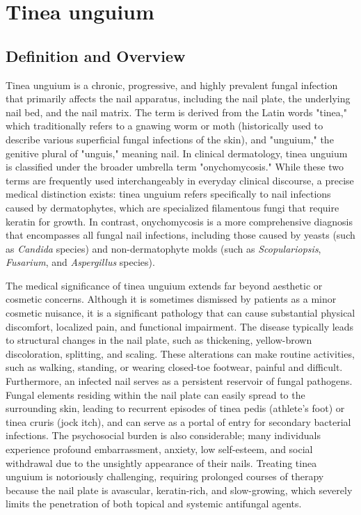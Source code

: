 \chapter{Tinea unguium}

\section*{Definition and Overview}
Tinea unguium is a chronic, progressive, and highly prevalent fungal infection that primarily affects the nail apparatus, including the nail plate, the underlying nail bed, and the nail matrix. The term is derived from the Latin words "tinea," which traditionally refers to a gnawing worm or moth (historically used to describe various superficial fungal infections of the skin), and "unguium," the genitive plural of "unguis," meaning nail. In clinical dermatology, tinea unguium is classified under the broader umbrella term "onychomycosis." While these two terms are frequently used interchangeably in everyday clinical discourse, a precise medical distinction exists: tinea unguium refers specifically to nail infections caused by dermatophytes, which are specialized filamentous fungi that require keratin for growth. In contrast, onychomycosis is a more comprehensive diagnosis that encompasses all fungal nail infections, including those caused by yeasts (such as \textit{Candida} species) and non-dermatophyte molds (such as \textit{Scopulariopsis}, \textit{Fusarium}, and \textit{Aspergillus} species).

The medical significance of tinea unguium extends far beyond aesthetic or cosmetic concerns. Although it is sometimes dismissed by patients as a minor cosmetic nuisance, it is a significant pathology that can cause substantial physical discomfort, localized pain, and functional impairment. The disease typically leads to structural changes in the nail plate, such as thickening, yellow-brown discoloration, splitting, and scaling. These alterations can make routine activities, such as walking, standing, or wearing closed-toe footwear, painful and difficult. Furthermore, an infected nail serves as a persistent reservoir of fungal pathogens. Fungal elements residing within the nail plate can easily spread to the surrounding skin, leading to recurrent episodes of tinea pedis (athlete's foot) or tinea cruris (jock itch), and can serve as a portal of entry for secondary bacterial infections. The psychosocial burden is also considerable; many individuals experience profound embarrassment, anxiety, low self-esteem, and social withdrawal due to the unsightly appearance of their nails. Treating tinea unguium is notoriously challenging, requiring prolonged courses of therapy because the nail plate is avascular, keratin-rich, and slow-growing, which severely limits the penetration of both topical and systemic antifungal agents.

